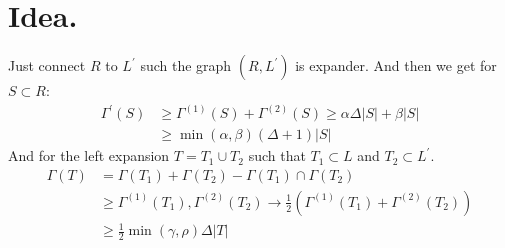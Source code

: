 \documentclass[manuscript,screen,review]{acmart}
\begin{document}
\section{Idea.}
Just connect $R$ to $L^{\prime}$ such the graph $(R,L^{\prime})$ is expander. And then we get for $S \subset R$:
\begin{equation*}
  \begin{split}
    \Gamma^{\prime}(S) & \ge \Gamma^{(1)}(S) +\Gamma^{(2)}(S) \ge \alpha\Delta|S| + \beta|S| \\
    & \ge \min \left( \alpha,\beta \right)\left( \Delta + 1 \right)|S|
  \end{split}
\end{equation*}
And for the left expansion $T = T_{1}\cup T_{2}$ such that $T_{1}\subset L$ and $T_{2} \subset L^{\prime}$. 
\begin{equation*}
  \begin{split}
    \Gamma\left( T \right) & =    \Gamma\left( T_{1} \right) +  \Gamma\left( T_{2} \right) -  \Gamma\left( T_{1} \right) \cap  \Gamma\left( T_{2} \right) \\
    & \ge \Gamma^{(1)}(T_{1}) ,  \Gamma^{(2)}(T_{2})\rightarrow \frac{1}{2}\left(\Gamma^{(1)}(T_{1}) +  \Gamma^{(2)}(T_{2})\right) \\ 
    & \ge \frac{1}{2}\min(\gamma,\rho) \Delta |T|
  \end{split}
\end{equation*}




\printbibliography
\end{document}
